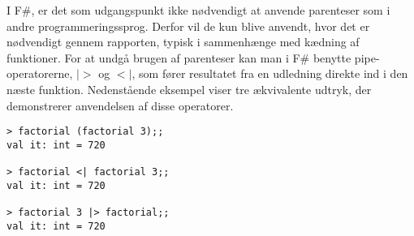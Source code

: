 I F\#, er det som udgangspunkt ikke nødvendigt at anvende parenteser som i andre programmeringssprog. Derfor vil de kun blive anvendt, hvor det er nødvendigt gennem rapporten, typisk i sammenhænge med kædning af funktioner. For at undgå brugen af parenteser kan man i F\# benytte pipe-operatorerne, $|>$ og $<|$, som fører resultatet fra en udledning direkte ind i den næste funktion. Nedenstående eksempel viser tre ækvivalente udtryk, der demonstrerer anvendelsen af disse operatorer.

\begin{lstlisting}[style=output, label={lst:pipe_operator}, caption={Eksempel på anvendelse af pipe-operatorer i F\#}]
> factorial (factorial 3);;
val it: int = 720

> factorial <| factorial 3;;
val it: int = 720

> factorial 3 |> factorial;;
val it: int = 720
\end{lstlisting}





